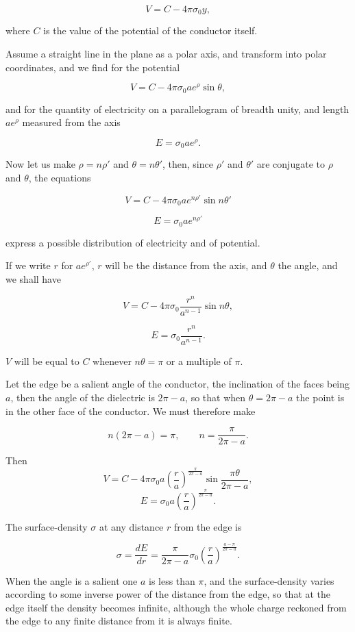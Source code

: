 \documentclass[11pt,a4paper]{article}
\begin{document}
\[
V=C-4\pi\sigma_0y,
\]

where $C$ is the value of the potential of the conductor itself.

Assume a straight line in the plane as a polar axis, and transform into polar coordinates, and we find for the potential

\[
V=C-4\pi\sigma_0ae^\rho\sin\theta,
\]

and for the quantity of electricity on a parallelogram of breadth unity, and length $ae^\rho$ measured from the axis

\[
E=\sigma_0ae^\rho.
\]

Now let us make $\rho=n\rho'$ and $\theta=n\theta'$, then, since $\rho'$ and $\theta'$ are conjugate to $\rho$ and $\theta$, the equations

\[
V=C-4\pi\sigma_0ae^{n\rho'}\sin n\theta'
\]

\[
E=\sigma_0ae^{n\rho'}
\]

express a possible distribution of electricity and of potential.

If we write $r$ for $ae^{\rho'}$, $r$ will be the distance from the axis, and $\theta$ the angle, and we shall have

\[
V=C-4\pi\sigma_0\frac{r^n}{a^{n-1}}\sin n\theta,
\]

\[
E=\sigma_0\frac{r^n}{a^{n-1}}.
\]

$V$ will be equal to $C$ whenever $n\theta=\pi$ or a multiple of $\pi$.

Let the edge be a salient angle of the conductor, the inclination of the faces being $a$, then the angle of the dielectric is $2\pi-a$, so that when $\theta=2\pi-a$ the point is in the other face of the conductor. We must therefore make

\[
n(2\pi-a)=\pi,
\qquad
n=\frac{\pi}{2\pi-a}.
\]

Then
\[
V=C-4\pi\sigma_0a
\left(\frac{r}{a}\right)^{\frac{\pi}{2\pi-a}}
\sin\frac{\pi\theta}{2\pi-a},
\]
\[
E=\sigma_0a
\left(\frac{r}{a}\right)^{\frac{\pi}{2\pi-a}}.
\]

The surface-density $\sigma$ at any distance $r$ from the edge is

\[
\sigma=\frac{dE}{dr}
=\frac{\pi}{2\pi-a}\sigma_0
\left(\frac{r}{a}\right)^{\frac{a-\pi}{2\pi-a}}.
\]

When the angle is a salient one $a$ is less than $\pi$, and the surface-density varies according to some inverse power of the distance from the edge, so that at the edge itself the density becomes infinite, although the whole charge reckoned from the edge to any finite distance from it is always finite.
\end{document}
